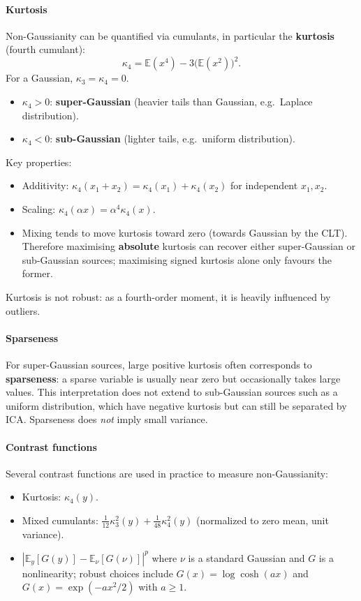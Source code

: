 \documentclass[11pt, oneside]{book}
\newcommand{\E}{\mathbb{E}}
\begin{document}
\paragraph{Kurtosis}
Non-Gaussianity can be quantified via cumulants, in particular the
\textbf{kurtosis} (fourth cumulant):
\[
  \kappa_4 = \E(x^4) - 3\bigl(\E(x^2)\bigr)^2.
\]
For a Gaussian, $\kappa_3 = \kappa_4 = 0$.
\begin{itemize}
  \item $\kappa_4 > 0$: \textbf{super-Gaussian} (heavier tails than Gaussian, e.g.\
        Laplace distribution).
  \item $\kappa_4 < 0$: \textbf{sub-Gaussian} (lighter tails, e.g.\ uniform distribution).
\end{itemize}
Key properties:
\begin{itemize}
  \item Additivity: $\kappa_4(x_1 + x_2) = \kappa_4(x_1) + \kappa_4(x_2)$ for
        independent $x_1, x_2$.
  \item Scaling: $\kappa_4(\alpha x) = \alpha^4 \kappa_4(x)$.
  \item Mixing tends to move kurtosis toward zero (towards Gaussian by the CLT).
        Therefore maximising \textbf{absolute} kurtosis can recover either super-Gaussian
        or sub-Gaussian sources; maximising signed kurtosis alone only favours the former.
\end{itemize}
Kurtosis is not robust: as a fourth-order moment, it is heavily influenced by outliers.

\paragraph{Sparseness}
For super-Gaussian sources, large positive kurtosis often corresponds to
\textbf{sparseness}: a sparse variable is usually near zero but occasionally takes large
values. This interpretation does not extend to sub-Gaussian sources such as a uniform
distribution, which have negative kurtosis but can still be separated by ICA.
Sparseness does \emph{not} imply small variance.

\paragraph{Contrast functions}
Several contrast functions are used in practice to measure non-Gaussianity:
\begin{itemize}
  \item Kurtosis: $\kappa_4(y)$.
  \item Mixed cumulants: $\frac{1}{12}\kappa_3^2(y) + \frac{1}{48}\kappa_4^2(y)$
        (normalized to zero mean, unit variance).
  \item $\left|\E_y[G(y)] - \E_\nu[G(\nu)]\right|^p$ where $\nu$ is a standard Gaussian
        and $G$ is a nonlinearity; robust choices include
        $G(x) = \log\cosh(ax)$ and $G(x) = \exp(-ax^2/2)$ with $a \geq 1$.
\end{itemize}
\end{document}
